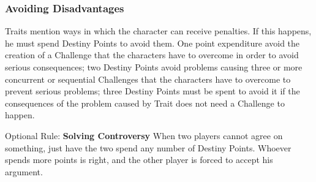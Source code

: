 \begin{multicols}{2}
\subsubsection{Avoiding Disadvantages}
Traits mention ways in which the character can receive penalties. If this happens, he must spend Destiny Points to avoid them. One point expenditure avoid the creation of a Challenge that the characters have to overcome in order to avoid serious consequences; two Destiny Points avoid problems causing three or more concurrent or sequential Challenges that the characters have to overcome to prevent serious problems; three Destiny Points must be spent to avoid it if the consequences of the problem caused by Trait does not need a Challenge to happen.

\begin{boco}
Optional Rule: \textbf{Solving Controversy}
When two players cannot agree on something, just have the two spend any number of Destiny Points. Whoever spends more points is right, and the other player is forced to accept his argument.
\end{boco}
\end{multicols}

\begin{center}
\end{center}

